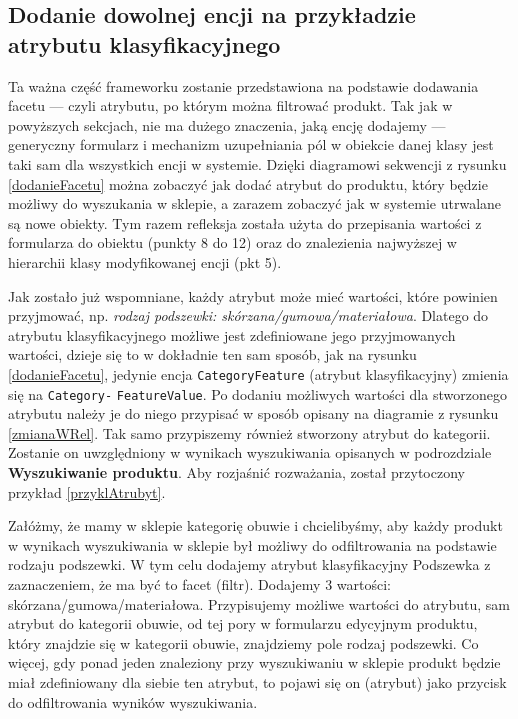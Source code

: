 \subsection{Dodanie dowolnej encji na przykładzie atrybutu klasyfikacyjnego}
Ta ważna część frameworku zostanie przedstawiona na podstawie dodawania facetu — czyli atrybutu, po którym można filtrować produkt. Tak jak w powyższych sekcjach, nie ma dużego znaczenia, jaką encję dodajemy — generyczny formularz i mechanizm uzupełniania pól w obiekcie danej klasy jest taki sam dla wszystkich encji w systemie. Dzięki diagramowi sekwencji z rysunku \ref{dodanieFacetu} można zobaczyć jak dodać atrybut do produktu, który będzie możliwy do wyszukania w sklepie, a zarazem zobaczyć jak w systemie utrwalane są nowe obiekty. Tym razem refleksja została użyta do przepisania wartości z formularza do obiektu (punkty 8 do 12) oraz do znalezienia najwyższej w hierarchii klasy modyfikowanej encji (pkt 5). 

Jak zostało już wspomniane, każdy atrybut może mieć wartości, które powinien przyjmować, np. \textit{rodzaj podszewki: skórzana/gumowa/materiałowa}. Dlatego do atrybutu klasyfikacyjnego możliwe jest zdefiniowane jego przyjmowanych wartości, dzieje się to w dokładnie ten sam sposób, jak na rysunku \ref{dodanieFacetu}, jedynie encja \texttt{CategoryFeature} (atrybut klasyfikacyjny) zmienia się na \texttt{Category-} \texttt{FeatureValue}. Po dodaniu możliwych wartości dla stworzonego atrybutu należy je do niego przypisać w sposób opisany na diagramie z rysunku \ref{zmianaWRel}. Tak samo przypiszemy również stworzony atrybut do kategorii. Zostanie on uwzględniony w wynikach wyszukiwania opisanych w podrozdziale \textbf{Wyszukiwanie produktu}. Aby rozjaśnić rozważania, został przytoczony przykład \ref{przyklAtrubyt}.
\begin{example} 
	Załóżmy, że mamy w sklepie kategorię obuwie i chcielibyśmy, aby każdy produkt w wynikach wyszukiwania w sklepie był możliwy do odfiltrowania na podstawie rodzaju podszewki. W tym celu dodajemy atrybut klasyfikacyjny Podszewka z zaznaczeniem, że ma być to facet (filtr). Dodajemy 3 wartości: skórzana/gumowa/materiałowa. Przypisujemy możliwe wartości do atrybutu, sam atrybut do kategorii obuwie, od tej pory w formularzu edycyjnym produktu, który znajdzie się w kategorii obuwie, znajdziemy pole rodzaj podszewki. Co więcej, gdy ponad jeden znaleziony przy wyszukiwaniu w sklepie produkt będzie miał zdefiniowany dla siebie ten atrybut, to pojawi się on (atrybut) jako przycisk do odfiltrowania wyników wyszukiwania.  
	\label{przyklAtrubyt}
\end{example}
 
